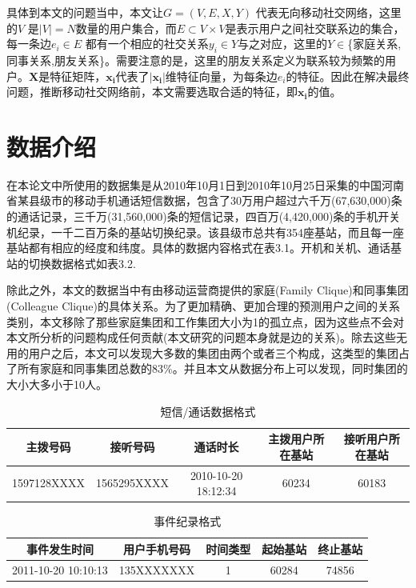 具体到本文的问题当中，本文让$G = (V, E, X, Y)$ 代表无向移动社交网络，这里的$V$ 是$|V| = N$数量的用户集合，而$E \subset V \times V$是表示用户之间社交联系边的集合，每一条边$e_i \in E$ 都有一个相应的社交关系$y_i \in Y$与之对应，这里的$Y \in $\{家庭关系, 同事关系,朋友关系\}。需要注意的是，这里的朋友关系定义为联系较为频繁的用户。$\textbf{X}$是特征矩阵，$\bm{x_i}$代表了$|\bm{x_i}|$维特征向量，为每条边$e_i$的特征。因此在解决最终问题，推断移动社交网络前，本文需要选取合适的特征，即$\bm{x_i}$的值。



\section{数据介绍}
在本论文中所使用的数据集是从2010年10月1日到2010年10月25日采集的中国河南省某县级市的移动手机通话短信数据，包含了30万用户超过六千万(67,630,000)条的通话记录，三千万(31,560,000)条的短信记录，四百万(4,420,000)条的手机开关机纪录，一千二百万条的基站切换纪录。该县级市总共有354座基站，而且每一座基站都有相应的经度和纬度。具体的数据内容格式在表3.1。开机和关机、通话基站的切换数据格式如表3.2.




除此之外，本文的数据当中有由移动运营商提供的家庭(Family Clique)和同事集团(Colleague Clique)的具体关系。为了更加精确、更加合理的预测用户之间的关系类别，本文移除了那些家庭集团和工作集团大小为1的孤立点，因为这些点不会对本文所分析的问题构成任何贡献(本文研究的问题本身就是边的关系)。除去这些无用的用户之后，本文可以发现大多数的集团由两个或者三个构成，这类型的集团占了所有家庭和同事集团总数的83\%。并且本文从数据分布上可以发现，同时集团的大小大多小于10人。


\begin{table}
    \centering
    \caption{短信/通话数据格式}
    \label{call-record}
    \begin{tabular}{c|c|c|c|c}
        \hline
        主拨号码 & 接听号码 & 通话时长 & 主拨用户所在基站 & 接听用户所在基站 \\ \hline
        1597128XXXX & 1565295XXXX & 2010-10-20 18:12:34 & 60234 & 60183 \\ \hline
    \end{tabular}
\end{table}


\begin{table}
    \centering
    \caption{事件纪录格式}
    \label{event-record}
    \begin{tabular}{c|c|c|c|c}
    \hline
    事件发生时间 & 用户手机号码 & 时间类型 & 起始基站 & 终止基站 \\ \hline
    2011-10-20 10:10:13   & 135XXXXXXX & 1 & 60284 & 74856  \\ \hline
    \end{tabular}
\end{table}


